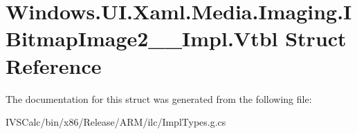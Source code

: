 \hypertarget{struct_windows_1_1_u_i_1_1_xaml_1_1_media_1_1_imaging_1_1_i_bitmap_image2_____impl_1_1_vtbl}{}\section{Windows.\+U\+I.\+Xaml.\+Media.\+Imaging.\+I\+Bitmap\+Image2\+\_\+\+\_\+\+Impl.\+Vtbl Struct Reference}
\label{struct_windows_1_1_u_i_1_1_xaml_1_1_media_1_1_imaging_1_1_i_bitmap_image2_____impl_1_1_vtbl}


The documentation for this struct was generated from the following file\+:\begin{DoxyCompactItemize}
\item 
I\+V\+S\+Calc/bin/x86/\+Release/\+A\+R\+M/ilc/Impl\+Types.\+g.\+cs\end{DoxyCompactItemize}
